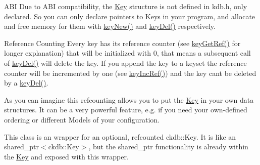 \begin{DoxyParagraph}{A\+BI}
Due to A\+BI compatibility, the {\ttfamily \hyperlink{classkdb_1_1Key}{Key}} structure is not defined in kdb.\+h, only declared. So you can only declare {\ttfamily pointers} to {\ttfamily Keys} in your program, and allocate and free memory for them with \hyperlink{group__key_gad23c65b44bf48d773759e1f9a4d43b89}{key\+New()} and \hyperlink{group__key_ga3df95bbc2494e3e6703ece5639be5bb1}{key\+Del()} respectively.
\end{DoxyParagraph}
\begin{DoxyParagraph}{Reference Counting}
Every key has its reference counter (see \hyperlink{group__key_ga4aabc4272506dd63161db2bbb42de8ae}{key\+Get\+Ref()} for longer explanation) that will be initialized with 0, that means a subsequent call of \hyperlink{group__key_ga3df95bbc2494e3e6703ece5639be5bb1}{key\+Del()} will delete the key. If you append the key to a keyset the reference counter will be incremented by one (see \hyperlink{group__key_ga6970a6f254d67af7e39f8e469bb162f1}{key\+Inc\+Ref()}) and the key can\textquotesingle{}t be deleted by a \hyperlink{group__key_ga3df95bbc2494e3e6703ece5639be5bb1}{key\+Del()}.
\end{DoxyParagraph}
\begin{DoxyParagraph}{}
As you can imagine this refcounting allows you to put the \hyperlink{classkdb_1_1Key}{Key} in your own data structures. It can be a very powerful feature, e.\+g. if you need your own-\/defined ordering or different Models of your configuration.
\end{DoxyParagraph}
This class is an wrapper for an optional, refcounted ckdb\+::\+Key. It is like an shared\+\_\+ptr$<$ckdb\+::\+Key$>$, but the shared\+\_\+ptr functionality is already within the \hyperlink{classkdb_1_1Key}{Key} and exposed with this wrapper.

